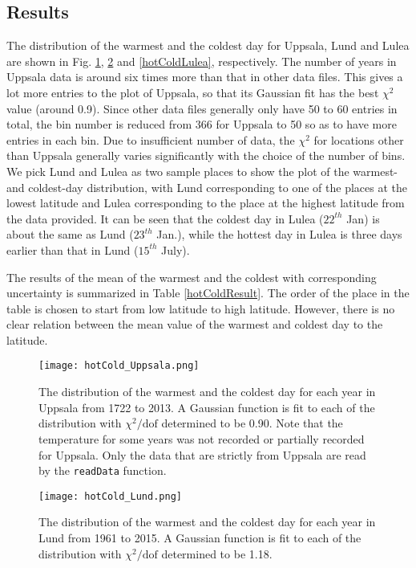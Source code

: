 \subsection{Results}
The distribution of the warmest and the coldest day for Uppsala, Lund and Lulea are shown in Fig. \ref{hotColdUppsala}, \ref{hotColdLund} and \ref{hotColdLulea}, respectively. The number of years in Uppsala data is around six times more than that in other data files. This gives a lot more entries to the plot of Uppsala, so that its Gaussian fit has the best $\chi^2$ value (around 0.9). Since other data files generally only have 50 to 60 entries in total, the bin number is reduced from 366 for Uppsala to 50 so as to have more entries in each bin. Due to insufficient number of data, the $\chi^2$ for locations other than Uppsala generally varies significantly with the choice of the number of bins. We pick Lund and Lulea as two sample places to show the plot of the warmest- and coldest-day distribution, with Lund corresponding to one of the places at the lowest latitude and Lulea corresponding to the place at the highest latitude from the data provided. It can be seen that the coldest day in Lulea ($22^{th}$ Jan) is about the same as Lund ($23^{th}$ Jan.), while the hottest day in Lulea is three days earlier than that in Lund ($15^{th}$ July). 

The results of the mean of the warmest and the coldest with corresponding uncertainty is summarized in Table \ref{hotColdResult}. The order of the place in the table is chosen to start from low latitude to high latitude. However, there is no clear relation between the mean value of the warmest and coldest day to the latitude.

\begin{figure}[H]
\centering
\texttt{[image: hotCold\_Uppsala.png]}
\caption{The distribution of the warmest and the coldest day for each year in Uppsala from 1722 to 2013. A Gaussian function is fit to each of the distribution with $\chi^2/\text{dof}$ determined to be 0.90. Note that the temperature for some years was not recorded or partially recorded for Uppsala. Only the data that are strictly from Uppsala are read by the \texttt{readData} function. }
\label{hotColdUppsala}
\end{figure}

\begin{figure}[H]
\centering
\texttt{[image: hotCold\_Lund.png]}
\caption{The distribution of the warmest and the coldest day for each year in Lund from 1961 to 2015. A Gaussian function is fit to each of the distribution with $\chi^2/\text{dof}$ determined to be 1.18.}
\label{hotColdLund}
\end{figure}

